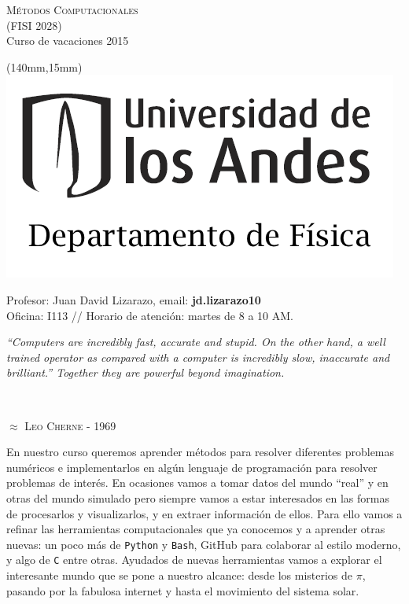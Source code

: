 \documentclass[letterpaper,10pt,onecolumn]{article}
\begin{document}
\thispagestyle{empty}
\begin{flushleft}


\textsc{\huge Métodos Computacionales}\\[0.01cm]

\normalsize (FISI 2028) \\
Curso de vacaciones 2015

\end{flushleft}

		\begin{textblock*}{20mm}(140mm,15mm)
  			\includegraphics[height=30 mm]{andes.png}
		\end{textblock*}

\noindent
Profesor: Juan David Lizarazo, email: \textbf{jd.lizarazo10}\\
Oficina: I113 // Horario de atención: martes de 8 a 10 AM. \\ 
\vspace{0.3cm}

\hfill\begin{minipage}{\dimexpr\textwidth-3cm}
\begin{flushright}\textit{``Computers are incredibly fast, accurate and stupid. On the other hand, a well trained operator as compared with a computer is incredibly slow, inaccurate and brilliant.'' Together they are powerful beyond imagination.}\end{flushright}
\end{minipage}

\noindent \\[-0.7cm]
\begin{flushright}\textsc{$\approx$ Leo Cherne - 1969}\end{flushright}

\vspace{0.1cm}


En nuestro curso queremos aprender métodos para resolver diferentes problemas numéricos e implementarlos en algún lenguaje de programación para resolver problemas de interés. En ocasiones vamos a tomar datos del mundo ``real'' y en otras del mundo simulado pero siempre vamos a estar interesados en las formas de procesarlos y visualizarlos, y en extraer información de ellos. Para ello vamos a refinar las herramientas computacionales que ya conocemos y a aprender otras nuevas: un poco más de \verb+Python+ y \verb+Bash+, GitHub para colaborar al estilo moderno, y algo de \verb+C+ entre otras. Ayudados de nuevas herramientas vamos a explorar el interesante mundo que se pone a nuestro alcance: desde los misterios de $\pi$, pasando por la fabulosa internet y hasta el movimiento del sistema solar.
\end{document}
